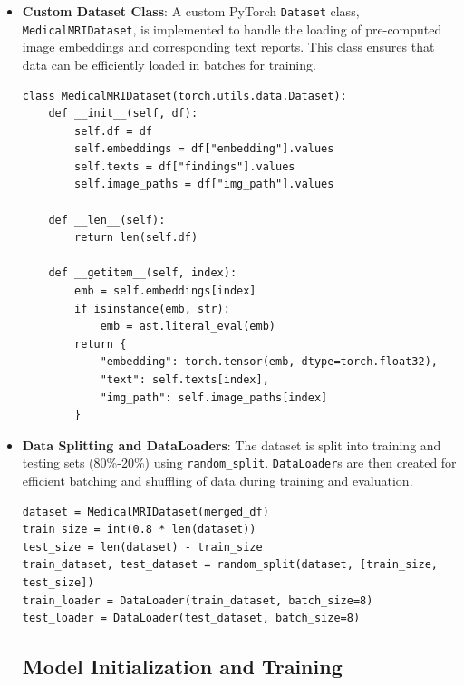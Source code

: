\documentclass[a4paper, 12pt]{article}
\begin{document}
\begin{itemize}
    \item \textbf{Custom Dataset Class}: A custom PyTorch \texttt{Dataset} class, \texttt{MedicalMRIDataset}, is implemented to handle the loading of pre-computed image embeddings and corresponding text reports. This class ensures that data can be efficiently loaded in batches for training.
    \begin{lstlisting}[breaklines=true]
class MedicalMRIDataset(torch.utils.data.Dataset):
    def __init__(self, df):
        self.df = df
        self.embeddings = df["embedding"].values
        self.texts = df["findings"].values
        self.image_paths = df["img_path"].values

    def __len__(self):
        return len(self.df)

    def __getitem__(self, index):
        emb = self.embeddings[index]
        if isinstance(emb, str):
            emb = ast.literal_eval(emb)
        return {
            "embedding": torch.tensor(emb, dtype=torch.float32),
            "text": self.texts[index],
            "img_path": self.image_paths[index]
        }
    \end{lstlisting}
    \item \textbf{Data Splitting and DataLoaders}: The dataset is split into training and testing sets (80\%-20\%) using \texttt{random\_split}. \texttt{DataLoader}s are then created for efficient batching and shuffling of data during training and evaluation.
    \begin{lstlisting}[breaklines=true]
dataset = MedicalMRIDataset(merged_df)
train_size = int(0.8 * len(dataset))
test_size = len(dataset) - train_size
train_dataset, test_dataset = random_split(dataset, [train_size, test_size])
train_loader = DataLoader(train_dataset, batch_size=8)
test_loader = DataLoader(test_dataset, batch_size=8)
    \end{lstlisting}

\subsection{Model Initialization and Training}


\end{itemize}
\end{document}
